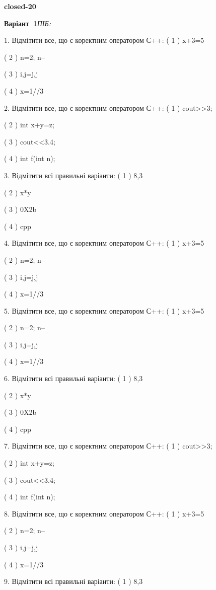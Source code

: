 \documentclass[11pt]{article}
\begin{document}
{\large\textbf{closed-20}}

\textbf{Варіант \No\,1}\hfill \textit{ПІБ:}\,\underline{\hspace{60mm}}
\vspace{4mm}

1. Відмітити все, що є коректним оператором С++:
( 1 ) x+3=5

( 2 ) n=2; n--

( 3 ) i,j=j,j

( 4 ) x=1//3

2. Відмітити все, що є коректним оператором С++:
( 1 ) cout>>3;

( 2 ) int x+y=z;

( 3 ) cout<<3.4;

( 4 ) int f(int n);

3. Відмітити всі правильні варіанти:
( 1 ) 8,3

( 2 ) x*y

( 3 ) 0X2b

( 4 ) cpp

4. Відмітити все, що є коректним оператором С++:
( 1 ) x+3=5

( 2 ) n=2; n--

( 3 ) i,j=j,j

( 4 ) x=1//3

5. Відмітити все, що є коректним оператором С++:
( 1 ) x+3=5

( 2 ) n=2; n--

( 3 ) i,j=j,j

( 4 ) x=1//3

6. Відмітити всі правильні варіанти:
( 1 ) 8,3

( 2 ) x*y

( 3 ) 0X2b

( 4 ) cpp

7. Відмітити все, що є коректним оператором С++:
( 1 ) cout>>3;

( 2 ) int x+y=z;

( 3 ) cout<<3.4;

( 4 ) int f(int n);

8. Відмітити все, що є коректним оператором С++:
( 1 ) x+3=5

( 2 ) n=2; n--

( 3 ) i,j=j,j

( 4 ) x=1//3

9. Відмітити всі правильні варіанти:
( 1 ) 8,3
\end{document}
